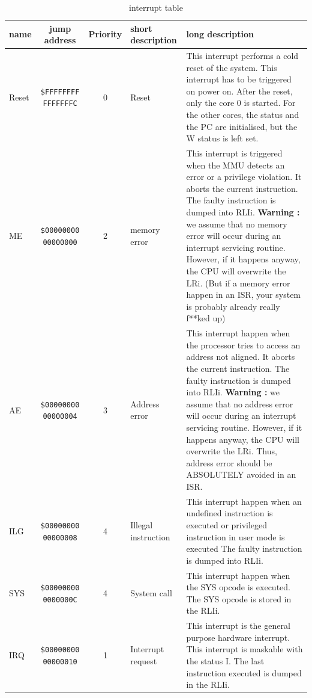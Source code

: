 \documentclass[11pt]{article}
\begin{document}
\begin{table}[h!]
    \begin{center}
        \caption{interrupt table}
        \label{tab:int}
        \begin{tabular}{|l|c|c|p{30mm}|p{70mm}|}
            \hline
            name & jump address & Priority & short description & long description \\ 
            \hline
            Reset & \texttt{\$FFFFFFFF FFFFFFFC} & 0 & Reset & This interrupt performs a cold reset of the system.
            This interrupt has to be triggered on power on. After the reset,
            only the core 0 is started. For the other cores, the status and the
            PC are initialised, but the W status is left set.\\
            \hline
            ME    & \texttt{\$00000000 00000000} & 2 & memory error &
            This interrupt is triggered when the MMU detects an error or a privilege violation.
            It aborts the current instruction.
            The faulty instruction is dumped into RLIi. \newline
            \textbf {Warning :} we assume that no memory error will occur during an interrupt servicing
            routine. However, if it happens anyway, the CPU will overwrite the LRi. (But if a memory error
            happen in an ISR, your system is probably already really f**ked up) \\
            \hline
            AE   & \texttt{\$00000000 00000004} & 3 & Address error & 
            This interrupt happen when the processor tries to access an address not aligned.
            It aborts the current instruction.
            The faulty instruction is dumped into RLIi. \newline
            \textbf{Warning :} we assume that no address error will occur during an interrupt servicing
            routine. However, if it happens anyway, the CPU will overwrite the LRi. 
            Thus, address error should be ABSOLUTELY avoided in an ISR. \\
            \hline
            ILG   & \texttt{\$00000000 00000008} & 4 & Illegal instruction &This interrupt happen when an undefined 
            instruction is executed or privileged instruction in user mode is executed
            The faulty instruction is dumped into RLIi. \\
            \hline
            SYS   & \texttt{\$00000000 0000000C} & 4 & System call & This interrupt happen when the SYS opcode is executed. 
            The SYS opcode is stored in the RLIi. \\
            \hline
            IRQ   & \texttt{\$00000000 00000010} & 1 & Interrupt request&This interrupt is the general 
            purpose hardware interrupt. This interrupt is maskable with the status I.
            The last instruction executed is dumped in the RLIi. \\
            \hline
        \end{tabular}
    \end{center}
\end{table}
\end{document}
